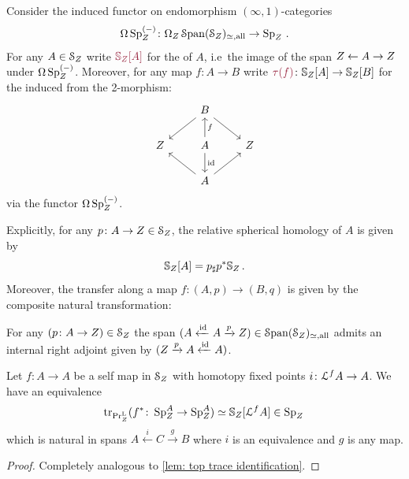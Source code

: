 \begin{notation}
Consider the induced functor on endomorphism $(\infty,1)$-categories
\[ \Omega \operatorname{Sp}_{Z}^{(-)}\colon \Omega_{Z}\operatorname{\mathcal S\mathrm{pan}}({\mathcal{S}_{Z}})_{\simeq,\mathrm{all}}\to \operatorname{Sp}_{Z}^{}\,.\]
For any $A\in \mathcal{S}_{Z}$ write $\mdef{\SS_{\base}[A]}$ for the 
 of $A$, i.e~the image
of the span $Z\leftarrow A \rightarrow Z$ under
$\Omega\operatorname{Sp}_{Z}^{(-)}$. Moreover, for any map 
$f\colon A\to B$ write $\mdef{\tf{f}}\colon \SS_{\base}[A]\to \SS_{\base}[B]$
for the  induced from the 2-morphism:
\[\begin{tikzcd}
	& B & \\
	\base & A & \base \\
	& A
	\arrow[from=1-2, to=2-1]
	\arrow[from=1-2, to=2-3]
	\arrow["f"', from=2-2, to=1-2]
	\arrow["\id", from=2-2, to=3-2]
	\arrow[from=3-2, to=2-1]
	\arrow[from=3-2, to=2-3]
\end{tikzcd}\]
via the functor $\Omega\operatorname{Sp}_{Z}^{(-)}$.
\end{notation}

\begin{rmk}
    Explicitly, for any $p\colon A\to Z \in \mathcal{S}_{Z}$, the
    relative spherical homology of $A$ is given by
    \[ \mathbb{S}_{Z}[A]= p_{\sharp}p^*\mathbb{S}_{Z}\,.\]
    Moreover, the transfer along a map $f\colon (A,p)\to (B,q)$
    is given by the composite natural transformation:
\end{rmk}

\begin{lem}\label{lem: etale internal right adj}
For any $(p\colon A\to Z)\in \mathcal{S}_{Z}$ the span 
$(A\xleftarrow{\operatorname{id}} A \xrightarrow{p} Z) \in \operatorname{\mathcal S\mathrm{pan}}({\mathcal{S}_{Z}})_{\simeq, \mathrm{all}}$ admits an internal right adjoint given by 
$(Z \xrightarrow{p} A \xleftarrow{\operatorname{id}} A)$.
\end{lem}

\begin{lem}\label{lem: homo trace identification}
    Let $f\colon A\to A$ be a self map in $\mathcal{S}_{Z}$ with homotopy
    fixed points $i\colon \mathcal{L}^fA \to A$. We have an equivalence 
    \[ \mathrm{tr}_{\mathrm{Pr}^{\mathrm{L}}_{Z}} (f^* \colon \operatorname{Sp}_{Z}^{A}\to \operatorname{Sp}_{Z}^{A})
    \simeq \mathbb{S}_{Z}[\mathcal{L}^fA] \in \operatorname{Sp}_{Z}\,
    \]
   which is natural in spans $A\xleftarrow{i} C \xrightarrow{g} B$ where
   $i$ is an equivalence and $g$ is any map.
\end{lem}
\begin{proof}
    Completely analogous to \cref{lem: top trace identification}. 
\end{proof}


